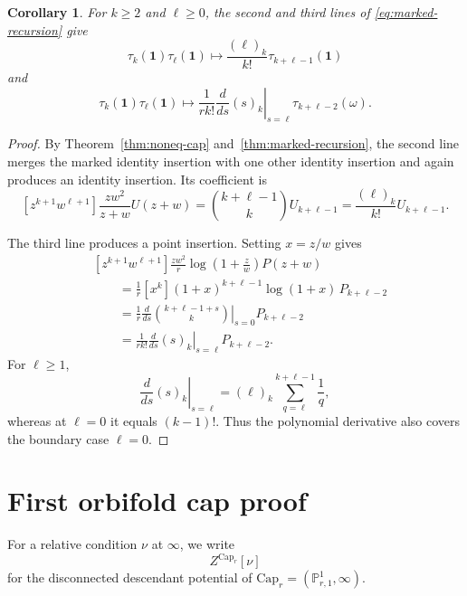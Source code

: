 \documentclass[letterpaper,12pt]{amsart}
\newtheorem{cor}[thm]{Corollary}
\theoremstyle{definition}
\newcommand{\id}{\mathbf 1}
\newcommand{\PP}{\mathbb P}
\newcommand{\OrbCap}{\mathrm{Cap}}
\numberwithin{equation}{section}
\begin{document}
\begin{cor}\label{cor:class-I-reactions}
For \(k\geq2\) and \(\ell\geq0\), the second and third lines of
\eqref{eq:marked-recursion} give
\[
  \tau_k(\id)\tau_\ell(\id)
  \longmapsto
  \frac{(\ell)_k}{k!}\tau_{k+\ell-1}(\id)
\]
and
\[
  \tau_k(\id)\tau_\ell(\id)
  \longmapsto
  \frac1{rk!}
  \left.\frac{d}{ds}(s)_k\right|_{s=\ell}
  \tau_{k+\ell-2}(\omega).
\]
\end{cor}
\begin{proof}
By Theorem~\ref{thm:noneq-cap} and~\ref{thm:marked-recursion}, the second
line merges the marked identity insertion with one other identity insertion
and again produces an identity insertion.  Its coefficient is
\[
  [z^{k+1}w^{\ell+1}]
  \frac{zw^2}{z+w}U(z+w)
  =
  \binom{k+\ell-1}{k}U_{k+\ell-1}
  =
  \frac{(\ell)_k}{k!}U_{k+\ell-1}.
\]

The third line produces a point insertion.  Setting \(x=z/w\) gives
\begin{align*}
  &[z^{k+1}w^{\ell+1}]
  \frac{zw^2}{r}
  \log\left(1+\frac zw\right)P(z+w)\\
  &\qquad=
  \frac1r[x^k](1+x)^{k+\ell-1}\log(1+x)\,
  P_{k+\ell-2}\\
  &\qquad=
  \frac1r
  \left.
    \frac{d}{ds}\binom{k+\ell-1+s}{k}
  \right|_{s=0}
  P_{k+\ell-2}\\
  &\qquad=
  \frac1{rk!}
  \left.\frac{d}{ds}(s)_k\right|_{s=\ell}
  P_{k+\ell-2}.
\end{align*}
For \(\ell\geq1\),
\[
  \left.\frac{d}{ds}(s)_k\right|_{s=\ell}
  =
  (\ell)_k\sum_{q=\ell}^{k+\ell-1}\frac1q,
\]
whereas at \(\ell=0\) it equals \((k-1)!\).  Thus the polynomial derivative
also covers the boundary case \(\ell=0\).
\end{proof}


\section{First orbifold cap proof}\label{sec:proof}

For a relative condition \(\nu\) at \(\infty\), we write
\[
  Z^{\OrbCap_r}[\nu]
\]
for the disconnected descendant potential of
\(\OrbCap_r=(\PP^1_{r,1},\infty)\).
\end{document}
